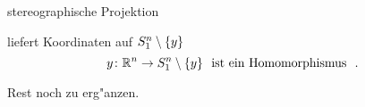 \documentclass[class=article, crop=false]{standalone}
\begin{document}
\begin{zettel}{stereographische Projektion}
\begin{flashcard}[]{}
	\begin{definition}
		liefert Koordinaten auf $S_1^n \setminus \set{y}$
		\[
			y \from \R^n\to S_1^n \setminus \set{y} \tx{ ist ein Homomorphismus }
		.\]

	\end{definition}

	Rest noch zu erg"anzen.

\end{flashcard}
\end{zettel}
\end{document}
